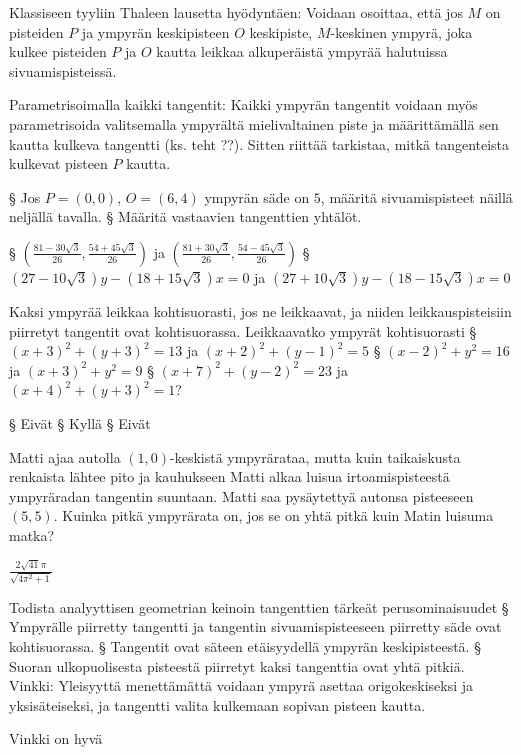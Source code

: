 \begin{tehtavasivu}
\begin{tehtava}
Klassiseen tyyliin Thaleen lausetta hyödyntäen: Voidaan osoittaa, että jos $M$ on pisteiden $P$ ja ympyrän keskipisteen $O$ keskipiste, $M$-keskinen ympyrä, joka kulkee pisteiden $P$ ja $O$ kautta leikkaa alkuperäistä ympyrää halutuissa sivuamispisteissä.

Parametrisoimalla kaikki tangentit: Kaikki ympyrän tangentit voidaan myös parametrisoida valitsemalla ympyrältä mielivaltainen piste ja määrittämällä sen kautta kulkeva tangentti (ks. teht ??). Sitten riittää tarkistaa, mitkä tangenteista kulkevat pisteen $P$ kautta.

\alakohdat
§ Jos $P = (0,0)$, $O = (6,4)$ ympyrän säde on $5$, määritä sivuamispisteet näillä neljällä tavalla.
§ Määritä vastaavien tangenttien yhtälöt.
\loppu
\begin{vastaus}
\alakohdat
§ $(\frac{81-30\sqrt{3}}{26},\frac{54+45\sqrt{3}}{26})$ ja $(\frac{81+30\sqrt{3}}{26},\frac{54-45\sqrt{3}}{26})$
§ $(27-10\sqrt{3})y-(18+15\sqrt{3})x = 0$ ja $(27+10\sqrt{3})y-(18-15\sqrt{3})x = 0$
\loppu
\end{vastaus}
\end{tehtava}

\begin{tehtava}
Kaksi ympyrää leikkaa kohtisuorasti, jos ne leikkaavat, ja niiden leikkauspisteisiin piirretyt tangentit ovat kohtisuorassa. Leikkaavatko ympyrät kohtisuorasti
\alakohdat
§ $(x+3)^2+(y+3)^2= 13$ ja $(x+2)^2+(y-1)^2 = 5 $
§ $(x-2)^2+y^2 = 16$ ja $(x+3)^2+y^2 = 9$
§ $(x+7)^2+(y-2)^2 = 23$ ja $(x+4)^2+(y+3)^2 = 1$?
\loppu  
\begin{vastaus}
\alakohdat
§ Eivät
§ Kyllä
§ Eivät
\loppu
\end{vastaus}
\end{tehtava}

\begin{tehtava}
Matti ajaa autolla $(1,0)$-keskistä ympyrärataa, mutta kuin taikaiskusta renkaista lähtee pito ja kauhukseen Matti alkaa luisua irtoamispisteestä ympyräradan tangentin suuntaan. Matti saa pysäytettyä autonsa pisteeseen $(5,5)$. Kuinka pitkä ympyrärata on, jos se on yhtä pitkä kuin Matin luisuma matka?
\begin{vastaus}
$\frac{2\sqrt{41}\pi}{\sqrt{4\pi^2+1}}$
\end{vastaus}
\end{tehtava}

\begin{tehtava}
Todista analyyttisen geometrian keinoin tangenttien tärkeät perusominaisuudet
\alakohdat
§ Ympyrälle piirretty tangentti ja tangentin sivuamispisteeseen piirretty säde ovat kohtisuorassa.
§ Tangentit ovat säteen etäisyydellä ympyrän keskipisteestä.
§ Suoran ulkopuolisesta pisteestä piirretyt kaksi tangenttia ovat yhtä pitkiä.
\loppu
Vinkki: Yleisyyttä menettämättä voidaan ympyrä asettaa origokeskiseksi ja yksisäteiseksi, ja tangentti valita kulkemaan sopivan pisteen kautta.
\begin{vastaus}
Vinkki on hyvä
\end{vastaus}
\end{tehtava}



\end{tehtavasivu}
